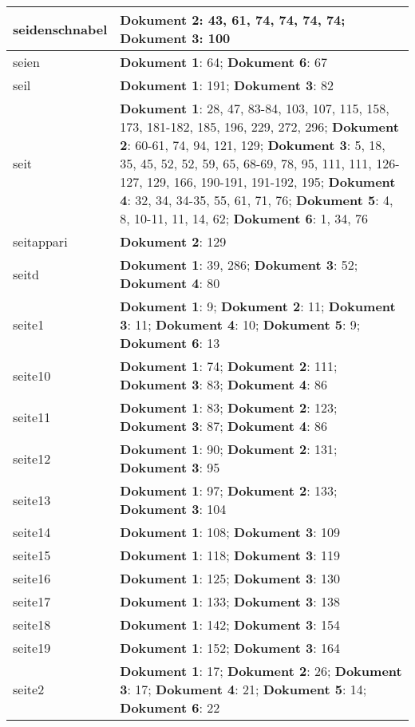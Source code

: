 \documentclass[a5paper]{article}
\begin{document}
\begin{longtable}[l]{|l|p{3in}|}
\hline
seidenschnabel & \textbf{Dokument 2}: 43, 61, 74, 74, 74, 74; \textbf{Dokument 3}: 100 \\
\hline
seien & \textbf{Dokument 1}: 64; \textbf{Dokument 6}: 67 \\
\hline
seil & \textbf{Dokument 1}: 191; \textbf{Dokument 3}: 82 \\
\hline
seit & \textbf{Dokument 1}: 28, 47, 83-84, 103, 107, 115, 158, 173, 181-182, 185, 196, 229, 272, 296; \textbf{Dokument 2}: 60-61, 74, 94, 121, 129; \textbf{Dokument 3}: 5, 18, 35, 45, 52, 52, 59, 65, 68-69, 78, 95, 111, 111, 126-127, 129, 166, 190-191, 191-192, 195; \textbf{Dokument 4}: 32, 34, 34-35, 55, 61, 71, 76; \textbf{Dokument 5}: 4, 8, 10-11, 11, 14, 62; \textbf{Dokument 6}: 1, 34, 76 \\
\hline
seitappari & \textbf{Dokument 2}: 129 \\
\hline
seitd & \textbf{Dokument 1}: 39, 286; \textbf{Dokument 3}: 52; \textbf{Dokument 4}: 80 \\
\hline
seite1 & \textbf{Dokument 1}: 9; \textbf{Dokument 2}: 11; \textbf{Dokument 3}: 11; \textbf{Dokument 4}: 10; \textbf{Dokument 5}: 9; \textbf{Dokument 6}: 13 \\
\hline
seite10 & \textbf{Dokument 1}: 74; \textbf{Dokument 2}: 111; \textbf{Dokument 3}: 83; \textbf{Dokument 4}: 86 \\
\hline
seite11 & \textbf{Dokument 1}: 83; \textbf{Dokument 2}: 123; \textbf{Dokument 3}: 87; \textbf{Dokument 4}: 86 \\
\hline
seite12 & \textbf{Dokument 1}: 90; \textbf{Dokument 2}: 131; \textbf{Dokument 3}: 95 \\
\hline
seite13 & \textbf{Dokument 1}: 97; \textbf{Dokument 2}: 133; \textbf{Dokument 3}: 104 \\
\hline
seite14 & \textbf{Dokument 1}: 108; \textbf{Dokument 3}: 109 \\
\hline
seite15 & \textbf{Dokument 1}: 118; \textbf{Dokument 3}: 119 \\
\hline
seite16 & \textbf{Dokument 1}: 125; \textbf{Dokument 3}: 130 \\
\hline
seite17 & \textbf{Dokument 1}: 133; \textbf{Dokument 3}: 138 \\
\hline
seite18 & \textbf{Dokument 1}: 142; \textbf{Dokument 3}: 154 \\
\hline
seite19 & \textbf{Dokument 1}: 152; \textbf{Dokument 3}: 164 \\
\hline
seite2 & \textbf{Dokument 1}: 17; \textbf{Dokument 2}: 26; \textbf{Dokument 3}: 17; \textbf{Dokument 4}: 21; \textbf{Dokument 5}: 14; \textbf{Dokument 6}: 22 \\

\end{longtable}
\end{document}
